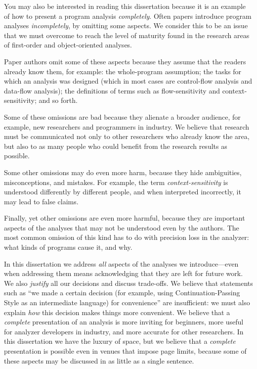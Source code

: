 \documentclass[12pt, oneside]{book}
\begin{document}
You may also be interested in reading this dissertation because it is an example of how to present a program analysis \emph{completely}. Often papers introduce program analyses \emph{incompletely}, by omitting some aspects. We consider this to be an issue that we must overcome to reach the level of maturity found in the research areas of first-order and object-oriented analyses.

Paper authors omit some of these aspects because they assume that the readers already know them, for example: the whole-program assumption; the tasks for which an analysis was designed (which in most cases are control-flow analysis and data-flow analysis); the definitions of terms such as flow-sensitivity and context-sensitivity; and so forth.

Some of these omissions are bad because they alienate a broader audience, for example, new researchers and programmers in industry. We believe that research must be communicated not only to other researchers who already know the area, but also to as many people who could benefit from the research results as possible.

Some other omissions may do even more harm, because they hide ambiguities, misconceptions, and mistakes. For example, the term \emph{context-sensitivity} is understood differently by different people, and when interpreted incorrectly, it may lead to false claims.

Finally, yet other omissions are even more harmful, because they are important aspects of the analyses that may not be understood even by the authors. The most common omission of this kind has to do with precision loss in the analyzer: what kinds of programs cause it, and why.

In this dissertation we address \emph{all} aspects of the analyses we introduce—even when addressing them means acknowledging that they are left for future work. We also \emph{justify} all our decisions and discuss trade-offs. We believe that statements such as “we made a certain decision (for example, using Continuation-Passing Style as an intermediate language) for convenience” are insufficient: we must also explain \emph{how} this decision makes things more convenient. We believe that a \emph{complete} presentation of an analysis is more inviting for beginners, more useful for analyzer developers in industry, and more accurate for other researchers. In this dissertation we have the luxury of space, but we believe that a \emph{complete} presentation is possible even in venues that impose page limits, because some of these aspects may be discussed in as little as a single sentence.
\end{document}
